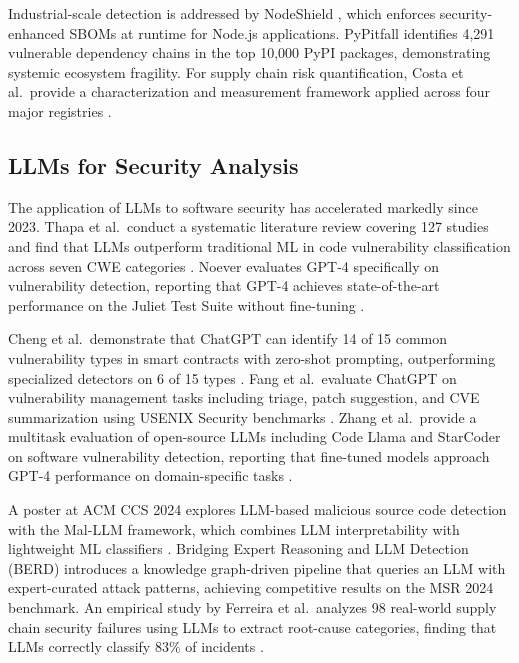 \documentclass[conference]{IEEEtran}
\begin{document}
Industrial-scale detection is addressed by NodeShield \cite{nodeshield2025ccs}, which enforces security-enhanced SBOMs at runtime for Node.js applications. PyPitfall \cite{pypitfall2025bigdata} identifies 4,291 vulnerable dependency chains in the top 10,000 PyPI packages, demonstrating systemic ecosystem fragility. For supply chain risk quantification, Costa et al.\ provide a characterization and measurement framework applied across four major registries \cite{scsrisk2024ase}.

\subsection{LLMs for Security Analysis}

The application of LLMs to software security has accelerated markedly since 2023. Thapa et al.\ conduct a systematic literature review covering 127 studies and find that LLMs outperform traditional ML in code vulnerability classification across seven CWE categories \cite{llmcybersec2025tosem}. Noever evaluates GPT-4 specifically on vulnerability detection, reporting that GPT-4 achieves state-of-the-art performance on the Juliet Test Suite without fine-tuning \cite{llmvulndetect2024icse}.

Cheng et al.\ demonstrate that ChatGPT can identify 14 of 15 common vulnerability types in smart contracts with zero-shot prompting, outperforming specialized detectors on 6 of 15 types \cite{chatgptvuln2024tosem}. Fang et al.\ evaluate ChatGPT on vulnerability management tasks including triage, patch suggestion, and CVE summarization using USENIX Security benchmarks \cite{chatgptvulnmgmt2024usenix}. Zhang et al.\ provide a multitask evaluation of open-source LLMs including Code Llama and StarCoder on software vulnerability detection, reporting that fine-tuned models approach GPT-4 performance on domain-specific tasks \cite{multitaskllm2024tse}.

A poster at ACM CCS 2024 explores LLM-based malicious source code detection with the Mal-LLM framework, which combines LLM interpretability with lightweight ML classifiers \cite{malllm2024ccs}. Bridging Expert Reasoning and LLM Detection (BERD) \cite{berd2026www} introduces a knowledge graph-driven pipeline that queries an LLM with expert-curated attack patterns, achieving competitive results on the MSR 2024 benchmark. An empirical study by Ferreira et al.\ analyzes 98 real-world supply chain security failures using LLMs to extract root-cause categories, finding that LLMs correctly classify 83\% of incidents \cite{llmsupplychain2023scored}.
\end{document}
